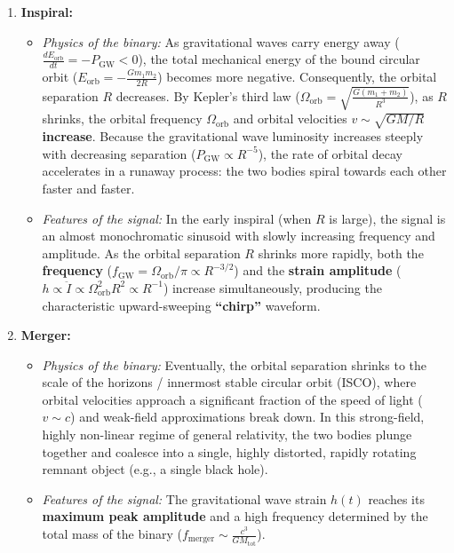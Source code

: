 \documentclass[12pt]{article}
\begin{document}
\begin{enumerate}[label=\alph*)]
\begin{enumerate}[label=\textbf{\arabic*.}]
\item \textbf{Inspiral:}
\begin{itemize}
\item \emph{Physics of the binary:} As gravitational waves carry energy away ($\frac{dE_{\text{orb}}}{dt} = -P_{\text{GW}} < 0$), the total mechanical energy of the bound circular orbit ($E_{\text{orb}} = -\frac{G m_1 m_2}{2R}$) becomes more negative. Consequently, the orbital separation $R$ decreases. By Kepler's third law ($\Omega_{\text{orb}} = \sqrt{\frac{G(m_1+m_2)}{R^3}}$), as $R$ shrinks, the orbital frequency $\Omega_{\text{orb}}$ and orbital velocities $v \sim \sqrt{GM/R}$ \textbf{increase}. Because the gravitational wave luminosity increases steeply with decreasing separation ($P_{\text{GW}} \propto R^{-5}$), the rate of orbital decay accelerates in a runaway process: the two bodies spiral towards each other faster and faster.
\item \emph{Features of the signal:} In the early inspiral (when $R$ is large), the signal is an almost monochromatic sinusoid with slowly increasing frequency and amplitude. As the orbital separation $R$ shrinks more rapidly, both the \textbf{frequency} ($f_{\text{GW}} = \Omega_{\text{orb}}/\pi \propto R^{-3/2}$) and the \textbf{strain amplitude} ($h \propto \ddot{I} \propto \Omega_{\text{orb}}^2 R^2 \propto R^{-1}$) increase simultaneously, producing the characteristic upward-sweeping \textbf{``chirp''} waveform.
\end{itemize}

\item \textbf{Merger:}
\begin{itemize}
\item \emph{Physics of the binary:} Eventually, the orbital separation shrinks to the scale of the horizons / innermost stable circular orbit (ISCO), where orbital velocities approach a significant fraction of the speed of light ($v \sim c$) and weak-field approximations break down. In this strong-field, highly non-linear regime of general relativity, the two bodies plunge together and coalesce into a single, highly distorted, rapidly rotating remnant object (e.g., a single black hole).
\item \emph{Features of the signal:} The gravitational wave strain $h(t)$ reaches its \textbf{maximum peak amplitude} and a high frequency determined by the total mass of the binary ($f_{\text{merger}} \sim \frac{c^3}{G M_{\text{tot}}}$).
\end{itemize}


\end{enumerate}
\end{enumerate}
\end{document}
